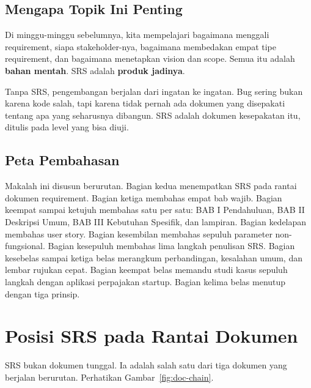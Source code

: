 \documentclass[11pt,a4paper]{article}
\begin{document}
\subsection{Mengapa Topik Ini Penting}

Di minggu-minggu sebelumnya, kita mempelajari bagaimana menggali requirement, siapa stakeholder-nya, bagaimana membedakan empat tipe requirement, dan bagaimana menetapkan vision dan scope. Semua itu adalah \textbf{bahan mentah}. SRS adalah \textbf{produk jadinya}.

Tanpa SRS, pengembangan berjalan dari ingatan ke ingatan. Bug sering bukan karena kode salah, tapi karena tidak pernah ada dokumen yang disepakati tentang apa yang seharusnya dibangun. SRS adalah dokumen kesepakatan itu, ditulis pada level yang bisa diuji.

\subsection{Peta Pembahasan}

Makalah ini disusun berurutan. Bagian kedua menempatkan SRS pada rantai dokumen requirement. Bagian ketiga membahas empat bab wajib. Bagian keempat sampai ketujuh membahas satu per satu: BAB I Pendahuluan, BAB II Deskripsi Umum, BAB III Kebutuhan Spesifik, dan lampiran. Bagian kedelapan membahas user story. Bagian kesembilan membahas sepuluh parameter non-fungsional. Bagian kesepuluh membahas lima langkah penulisan SRS. Bagian kesebelas sampai ketiga belas merangkum perbandingan, kesalahan umum, dan lembar rujukan cepat. Bagian keempat belas memandu studi kasus sepuluh langkah dengan aplikasi perpajakan startup. Bagian kelima belas menutup dengan tiga prinsip.

\section{Posisi SRS pada Rantai Dokumen}

SRS bukan dokumen tunggal. Ia adalah salah satu dari tiga dokumen yang berjalan berurutan. Perhatikan Gambar~\ref{fig:doc-chain}.
\end{document}
